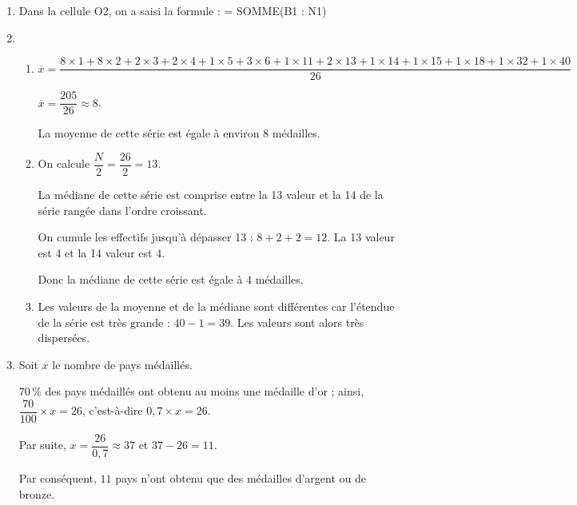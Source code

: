 
\medskip

\begin{enumerate}
\item Dans la cellule O2, on a saisi la formule : = SOMME(B1 : N1)   
\item 
	\begin{enumerate}
	\item $\overline{x} = \dfrac{8\times 1 + 8\times 2 + 2 \times 3 + 2 \times 4 + 1 \times 5 + 3 \times 6 + 1\times 11 + 2 \times 13 + 1\times 14 + 1 \times 15 + 1 \times 18 + 1\times 32 + 1 \times 40}{26}$
	
$\overline{x} = \dfrac{205}{26} \approx  8$. 

La moyenne de cette série est égale \`{a} environ 8 médailles.

	\item On calcule $\dfrac{N}{2}= \dfrac{26}{2} = 13$. 
	
La médiane de cette série est comprise entre la 13 valeur et la 
  14 de la série rangée dans l'ordre croissant.
  
On cumule les effectifs jusqu'\`{a} dépasser 13 :  $8 + 2 + 2= 12$. La 13 valeur est 4 et la 14 valeur est 4.

Donc la médiane de cette série est égale \`{a} 4 médailles.
	\item Les valeurs de la moyenne et de la médiane sont différentes car l'étendue de la série est très grande : $40 - 1 = 39$. Les valeurs sont alors très dispersées.
		\end{enumerate}
\item  Soit $x$ le nombre de pays médaillés.

70\,\% des pays médaillés ont obtenu au moins une médaille d'or ; ainsi, $\dfrac{70}{100} \times x = 26$, c'est-\`{a}-dire $0,7\times x = 26$.

Par suite, $x = \dfrac{26}{0,7} \approx 37$ et $37 - 26 =11$.

Par conséquent, $11$ pays n'ont obtenu que des médailles d'argent ou de bronze.
\end{enumerate}
